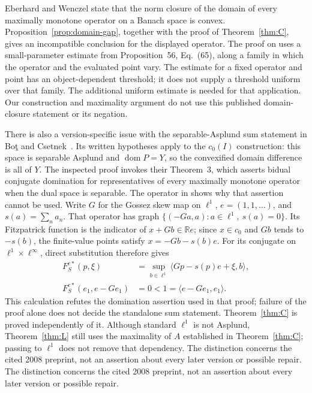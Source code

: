 \documentclass[11pt]{article}
\newcommand{\R}{\mathbb R}
\newcommand{\dom}{\operatorname{dom}}
\newcommand{\pair}[2]{\langle #1,#2\rangle}
\begin{document}
Eberhard and Wenczel \cite[Theorem~57]{eberhardwenczel2024} state that
the norm closure of the domain of every maximally monotone operator on
a Banach space is convex. Proposition~\ref{prop:domain-gap}, together
with the proof of Theorem~\ref{thm:C}, gives an incompatible
conclusion for the displayed operator. The proof on
\cite[pp.~39--40]{eberhardwenczel2024} uses a small-parameter estimate
from Proposition~56, Eq.~(65), along a family in which the operator and
the evaluated point vary. The estimate for a fixed operator and point
has an object-dependent threshold; it does not supply a threshold
uniform over that family. The additional uniform estimate is needed
for that application. Our construction and maximality argument do not
use this published domain-closure statement or its negation.

There is also a version-specific issue with the separable-Asplund sum
statement in Bo\c{t} and Csetnek~\cite[Corollary~11]{botcsetnek2008}.
Its written hypotheses apply to the $c_0(I)$ construction: this space
is separable Asplund and $\dom P=Y$, so the convexified domain difference
is all of $Y$. The inspected proof invokes their Theorem~3, which asserts
bidual conjugate domination for representatives of every maximally
monotone operator when the dual space is separable. The operator in
\cite[author version, Lemma~2.1]{buenosvaiter2011} shows why that assertion cannot be used.
Write $G$ for the Gossez skew map on $\ell^1$, $e=(1,1,\ldots)$, and
$s(a)=\sum_n a_n$. That operator has graph
$\{(-Ga,a):a\in\ell^1,\ s(a)=0\}$. Its Fitzpatrick function is the
indicator of $x+Gb\in\R e$; since $x\in c_0$ and $Gb$ tends to $-s(b)$,
the finite-value points satisfy $x=-Gb-s(b)e$. For its conjugate on
$\ell^1\times\ell^\infty$, direct substitution therefore gives
\begin{equation}
\begin{aligned}
F_S^{c*}(p,\xi)
 &=\sup_{b\in\ell^1}\pair{Gp-s(p)e+\xi}{b},\\
F_S^{c*}(e_1,e-Ge_1)&=0<1=\pair{e-Ge_1}{e_1}.
\end{aligned}
\label{eq:bidual-interface}
\end{equation}
This calculation refutes the domination assertion used in that proof;
failure of the proof alone does not decide the standalone sum statement.
Theorem~\ref{thm:C} is proved independently of it.
\ifdefined\expandedversion
Although standard
$\ell^1$ is not Asplund, Theorem~\ref{thm:L} still uses the maximality
of $A$ established in Theorem~\ref{thm:C}; passing to $\ell^1$ does not
remove that dependency. The distinction concerns the cited 2008 preprint,
not an assertion about every later version or possible repair.
\else
The distinction concerns the cited 2008 preprint, not an assertion about
every later version or possible repair.
\fi
\end{document}
